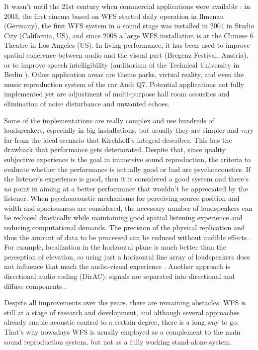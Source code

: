 It wasn't until the 21st century when commercial applications were available \cite{Brandenburg2009}: in 2003, the first cinema based on WFS started daily operation in Ilmenau (Germany), the first WFS system in a sound stage was installed in 2004 in Studio City (California, US), and since 2008 a large WFS installation is at the Chinese 6 Theatre in Los Angeles (US). In living performance, it has been used to improve spatial coherence between audio and the visual part (Bregenz Festival, Austria), or to improve speech intelligibility (auditorium of the Technical University in Berlin \cite{Musicology}). Other application areas are theme parks, virtual reality, and even the music reproduction system of the car Audi Q7. Potential applications not fully implemented yet are adjustment of multi-purpose hall room acoustics and elimination of noise disturbance and unwanted echoes.

Some of the implementations are really complex and use hundreds of loudspeakers, especially in big installations, but usually they are simpler and very far from the ideal scenario that Kirchhoff's integral describes. This has the drawback that performance gets deteriorated. Despite that, since quality subjective experience is the goal in immersive sound reproduction, the criteria to evaluate whether the performance is actually good or bad are psychoacoustics. If the listener's experience is good, then it is considered a good system and there's no point in aiming at a better performance that wouldn't be appreciated by the listener.
When psychoacoustic mechanisms for perceiving source position and width and spaciousness are considered, the necessary number of loudspeakers can be reduced drastically while maintaining good spatial listening experience and reducing computational demands. The precision of the physical replication and thus the amount of data to be processed can be reduced without audible effects \cite{Musicology}. For example, localization in the horizontal plane is much better than the perception of elevation, so using just a horizontal line array of loudspeakers does not influence that much the audio-visual experience \cite{Brandenburg2009}. Another approach is directional audio coding (DirAC): signals are separated into directional and diffuse components \cite{Musicology}.

Despite all improvements over the years, there are remaining obstacles. WFS is still at a stage of research and development, and although several approaches already enable acoustic control to a certain degree, there is a long way to go.
That's why nowadays WFS is usually employed as a complement to the main sound reproduction system, but not as a fully working stand-alone system.

